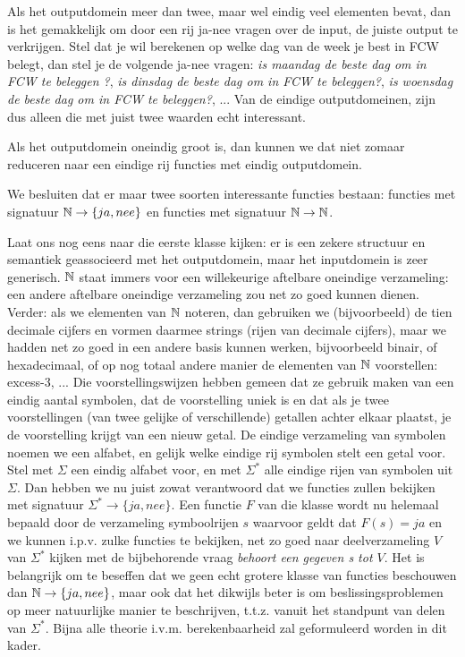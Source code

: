 Als het outputdomein meer dan twee, maar wel eindig veel elementen
bevat, dan is het gemakkelijk om door een rij ja-nee vragen over de
input, de juiste output te verkrijgen. Stel dat je wil berekenen op
welke dag van de week je best in FCW belegt, dan stel je de volgende
ja-nee vragen: {\em is maandag de beste dag om in FCW te beleggen
?}, {\em is dinsdag de beste dag om in FCW te beleggen?}, 
{\em is woensdag de beste dag om in FCW te beleggen?}, ...
Van de eindige outputdomeinen, zijn dus alleen die met juist twee
waarden echt interessant.


Als het outputdomein oneindig groot is, dan kunnen we dat niet zomaar
reduceren naar een eindige rij functies met eindig outputdomein.


We besluiten dat er maar twee soorten interessante functies bestaan:
functies met signatuur $\mathbb{N} \rightarrow\{ja,nee\}$ en functies met
signatuur $\mathbb{N} \rightarrow \mathbb{N}$. 

Laat ons nog eens naar die eerste klasse kijken: er is een zekere
structuur en semantiek geassocieerd met het outputdomein, maar het
inputdomein is zeer generisch. $\mathbb{N}$ staat immers voor een willekeurige
aftelbare oneindige verzameling: een andere aftelbare oneindige
verzameling zou net zo goed kunnen dienen. Verder: als we elementen
van $\mathbb{N}$ noteren, dan gebruiken we (bijvoorbeeld) de tien decimale
cijfers en vormen daarmee strings (rijen van decimale cijfers), maar
we hadden net zo goed in een andere basis kunnen werken, bijvoorbeeld
binair, of hexadecimaal, of op nog totaal andere manier de elementen
van $\mathbb{N}$ voorstellen: excess-3, ...  Die voorstellingswijzen hebben
gemeen dat ze gebruik maken van een eindig aantal symbolen, dat de
voorstelling uniek is en dat als je twee voorstellingen (van twee
gelijke of verschillende) getallen achter elkaar plaatst, je de
voorstelling krijgt van een nieuw getal.  De eindige verzameling van
symbolen noemen we een alfabet, en gelijk welke eindige rij symbolen
stelt een getal voor. Stel met $\Sigma$ een eindig alfabet voor, en
met $\Sigma^*$ alle eindige rijen van symbolen uit $\Sigma$. Dan
hebben we nu juist zowat verantwoord dat we functies zullen bekijken
met signatuur $\Sigma^* \rightarrow \{ja,nee\}$. Een functie $F$ van
die klasse wordt nu helemaal bepaald door de verzameling symboolrijen
$s$ waarvoor geldt dat $F(s) = ja$ en we kunnen i.p.v. zulke functies
te bekijken, net zo goed naar deelverzameling $V$ van $\Sigma^*$
kijken met de bijbehorende vraag {\em behoort een gegeven s tot
$V$}. Het is belangrijk om te beseffen dat we geen echt grotere
klasse van functies beschouwen dan $\mathbb{N} \rightarrow\{ja,nee\}$, maar
ook dat het dikwijls beter is om beslissingsproblemen op meer
natuurlijke manier te beschrijven, t.t.z. vanuit het standpunt van
delen van $\Sigma^*$. Bijna alle theorie i.v.m. berekenbaarheid zal
geformuleerd worden in dit kader.  

